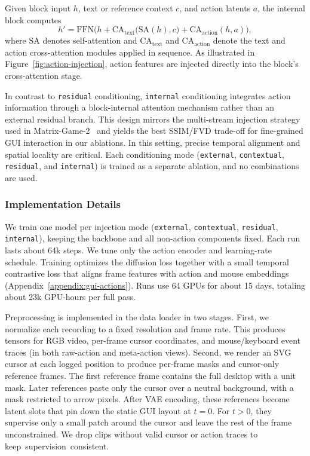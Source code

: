 Given block input $h$, text or reference context $c$, and action latents $a$, the internal block computes
\[
  h' = \mathrm{FFN}\Big(
    h + \mathrm{CA}_{\text{text}}\big(\mathrm{SA}(h), c\big)
      + \mathrm{CA}_{\text{action}}(h, a)
  \Big),
\]
where $\mathrm{SA}$ denotes self-attention and $\mathrm{CA}_{\text{text}}$ and $\mathrm{CA}_{\text{action}}$ denote the text and action cross-attention modules applied in sequence.
As illustrated in Figure~\ref{fig:action-injection}, action features are injected directly into the block’s cross-attention stage.

In contrast to \texttt{residual} conditioning, \texttt{internal} conditioning integrates action information through a block-internal attention mechanism rather than an external residual branch.
This design mirrors the multi-stream injection strategy used in Matrix-Game-2~\citep{he2025matrix} and yields the best SSIM/FVD trade-off for fine-grained GUI interaction in our ablations.
In this setting, precise temporal alignment and spatial locality are critical.
Each conditioning mode (\texttt{external}, \texttt{contextual}, \texttt{residual}, and \texttt{internal}) is trained as a separate ablation, and no combinations are used.

\subsubsection{Implementation Details}
We train one model per injection mode (\texttt{external}, \texttt{contextual}, \texttt{residual}, \texttt{internal}), keeping the backbone and all non-action components fixed.
Each run lasts about 64k steps.
We tune only the action encoder and learning-rate schedule.
Training optimizes the diffusion loss together with a small temporal contrastive loss that aligns frame features with action and mouse embeddings (Appendix~\ref{appendix:gui-actions}).
Runs use 64 GPUs for about 15 days, totaling about 23k GPU-hours per full pass.

Preprocessing is implemented in the data loader in two stages.
First, we normalize each recording to a fixed resolution and frame rate.
This produces tensors for RGB video, per-frame cursor coordinates, and mouse/keyboard event traces (in both raw-action and meta-action views).
Second, we render an SVG cursor at each logged position to produce per-frame masks and cursor-only reference frames.
The first reference frame contains the full desktop with a unit mask.
Later references paste only the cursor over a neutral background, with a mask restricted to arrow pixels.
After VAE encoding, these references become latent slots that pin down the static GUI layout at $t{=}0$.
For $t{>}0$, they supervise only a small patch around the cursor and leave the rest of the frame unconstrained.
We drop clips without valid cursor or action traces to keep~supervision~consistent.

